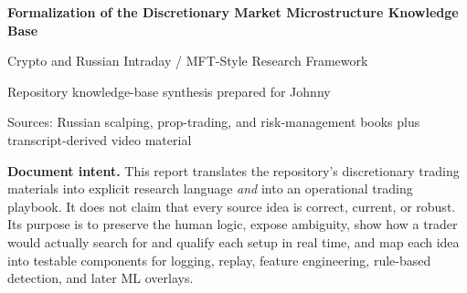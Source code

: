 \documentclass[11pt]{article}
\begin{document}

\begingroup
\thispagestyle{plain}
\begin{center}
{\LARGE\bfseries Formalization of the Discretionary Market Microstructure Knowledge Base\par}
\vspace{0.5em}
{\large Crypto and Russian Intraday / MFT-Style Research Framework\par}
\vspace{0.75em}
{\normalsize Repository knowledge-base synthesis prepared for Johnny\par}
\vspace{0.5em}
{\small Sources: Russian scalping, prop-trading, and risk-management books plus transcript-derived video material\par}
\end{center}

\vspace{0.5em}
\noindent
\colorbox{SoftGray}{
\parbox{\dimexpr\linewidth-2\fboxsep}{
\textbf{Document intent.}
This report translates the repository's discretionary trading materials into explicit research language \emph{and} into an operational trading playbook.
It does not claim that every source idea is correct, current, or robust.
Its purpose is to preserve the human logic, expose ambiguity, show how a trader would actually search for and qualify each setup in real time, and map each idea into testable components for logging, replay, feature engineering, rule-based detection, and later ML overlays.
}}

\vspace{0.8em}
{\small
\setcounter{tocdepth}{2}
\tableofcontents
}
\endgroup

\clearpage









\appendix

\end{document}
